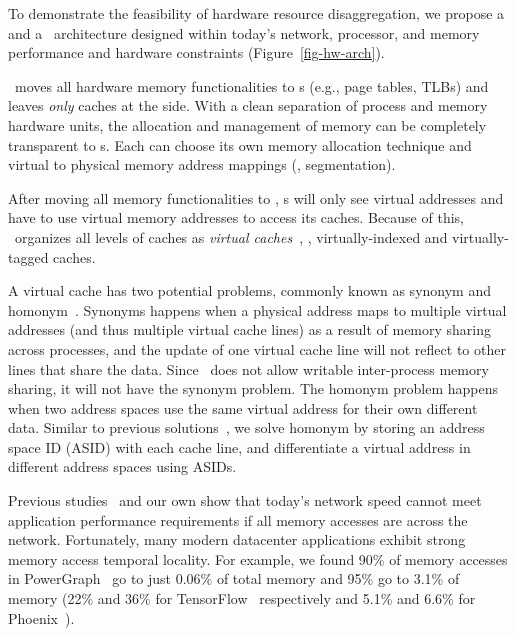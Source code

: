 \documentclass[10pt,times,twocolumn]{z2-article}
\begin{document}
{{{{{{{To demonstrate the feasibility of hardware resource disaggregation,
we propose a \pcomponent{} and a \mcomponent\ architecture designed 
within today's network, processor, and memory performance and hardware constraints
(Figure~\ref{fig-hw-arch}).

\lego\ moves all hardware memory functionalities to \mcomponent{}s 
(e.g., page tables, TLBs) and leaves {\em only} caches at the \pcomponent{} side. 
With a clean separation of process and memory hardware units, 
the allocation and management of memory can be completely transparent to \pcomponent{}s.
Each \mcomponent{} can choose its own memory allocation technique
and virtual to physical memory address mappings (\eg, segmentation). 

After moving all memory functionalities to \mcomponent, %
\pcomponent{}s will only see virtual addresses and have to use virtual memory addresses to access its caches. 
Because of this, \lego\ organizes all levels of \pcomponent{} caches as {\em virtual caches}~\cite{Goodman-ASPLOS87,Wang-ISCA89},
\ie, virtually-indexed and virtually-tagged caches.

A virtual cache has two potential problems, commonly known as synonym and homonym~\cite{CacheMemory82}.
Synonyms happens when a physical address maps to multiple virtual addresses (and thus multiple virtual cache lines) 
as a result of memory sharing across processes,
and the update of one virtual cache line will not reflect to other lines that share the data.
Since \lego\ does not allow writable inter-process memory sharing,
it will not have the synonym problem.
The homonym problem happens when two address spaces use the same virtual address for their own different data.
Similar to previous solutions~\cite{OVC}, we solve homonym by storing an address space ID (ASID) with each cache line,
and differentiate a virtual address in different address spaces using ASIDs.


Previous studies~\cite{Gao16-OSDI,GU17-NSDI} and our own show that today's network speed 
cannot meet application performance requirements if all memory accesses are across the network. 
Fortunately, many modern datacenter applications exhibit strong memory access temporal locality.
For example, we found 90\% of memory accesses in PowerGraph~\cite{Gonzalez12-OSDI} go to just 0.06\% of total memory
and 95\% go to 3.1\% of memory
(22\% and 36\% for TensorFlow~\cite{TensorFlow} respectively
and 5.1\% and 6.6\% for Phoenix~\cite{Ranger07-HPCA}).

}}}}}}}
\end{document}
